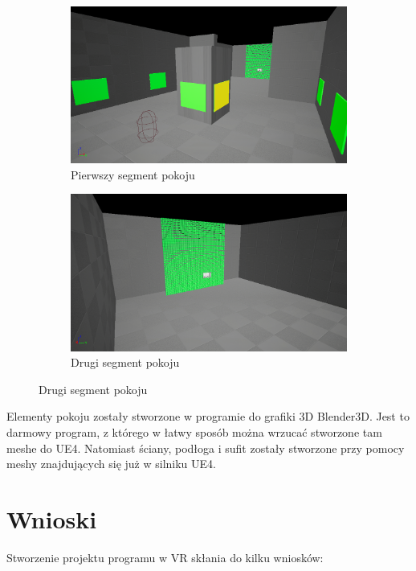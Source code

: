 \documentclass[a4paper,12pt,reqno]{article}
\begin{document}
\begin{figure}[H]%
	\centering
	\begin{subfigure}{.5\textwidth}
		\centering
		\includegraphics[width=0.8\linewidth]{graphics/05/GalleryRoom.png}
		\caption{Pierwszy segment pokoju }	
		\label{ref:subref_a}
	\end{subfigure}%
	\begin{subfigure}{.5\textwidth}
		\centering
		\includegraphics[width=0.8\linewidth]{graphics/05/GalleryRoom2.png}
		\caption{Drugi segment pokoju}
		\label{ref:subref_b}
	\end{subfigure}%
\label{ref:ref}
\end{figure}

Elementy pokoju zostały stworzone w programie do grafiki 3D Blender3D. Jest to darmowy program, z którego w łatwy sposób można wrzucać stworzone tam meshe do UE4. Natomiast ściany, podłoga i sufit zostały stworzone przy pomocy meshy znajdujących się już w silniku UE4.

\section{Wnioski}


Stworzenie projektu programu w VR skłania do kilku wniosków:
\end{document}
